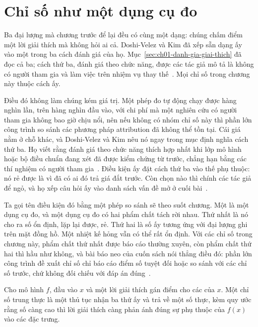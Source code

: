 \section{Chỉ số như một dụng cụ đo}
\label{sec:ch08-chi-so-nhu-mot-dung-cu}

%
%
Ba đại lượng mà chương trước để lại đều có cùng một dạng: chúng chấm điểm một
lời giải thích mà không hỏi ai cả. Doshi-Velez và Kim đã xếp sẵn dạng ấy vào một
trong ba cách đánh giá của họ. Mục~\ref{sec:ch01-danh-gia-giai-thich} đã đọc cả
ba; cách thứ ba, đánh giá theo chức năng, được các tác giả mô tả là không có
người tham gia và làm việc trên nhiệm vụ thay thế~\autocite{p14rigorous}. Mọi
chỉ số trong chương này thuộc cách ấy.

Điều đó không làm chúng kém giá trị. Một phép đo tự động chạy được hàng nghìn
lần, trên hàng nghìn đầu vào, với chi phí mà một nghiên cứu có người tham gia
không bao giờ chịu nổi, nên nếu không có nhóm chỉ số này thì phần lớn công trình
so sánh các phương pháp attribution đã không thể tồn tại. Cái giá nằm ở chỗ
khác, và Doshi-Velez và Kim nêu nó ngay trong mục định nghĩa cách thứ ba. Họ viết
rằng đánh giá theo chức năng thích hợp nhất khi lớp mô hình hoặc bộ điều chuẩn
đang xét đã được kiểm chứng từ trước, chẳng hạn bằng các thí nghiệm có người
tham gia~\autocite{p14rigorous}. Điều kiện ấy đặt cách thứ ba vào thế phụ thuộc:
nó rẻ được là vì đã có ai đó trả giá đắt trước. Còn chọn  nào
thì chính các tác giả để ngỏ, và họ xếp câu hỏi ấy vào danh sách vấn đề mở ở
cuối bài~\autocite{p14rigorous}.

Ta gọi tên điều kiện đó bằng một phép so sánh sẽ theo suốt chương. Một 
là một dụng cụ đo, và một dụng cụ đo có hai phẩm chất tách rời nhau.
Thứ nhất là nó cho ra số ổn định, lặp lại được, rẻ. Thứ hai là số ấy tương ứng
với đại lượng ghi trên mặt đồng hồ. Một nhiệt kế hỏng vẫn có thể rất ổn định.
Với các chỉ số trong chương này, phẩm chất thứ nhất được báo cáo thường xuyên,
còn phẩm chất thứ hai thì hầu như không, và bài báo neo của cuốn sách nói thẳng
điều đó: phần lớn công trình đề xuất chỉ số chỉ báo cáo điểm số tuyệt đối hoặc
so sánh với các chỉ số trước, chứ không đối chiếu với đáp án
đúng~\autocite{p21metrics}.

\begin{definition}
\label{def:ch08-chi-so-trung-thuc}
Cho mô hình $f$, đầu vào $x$ và một lời giải thích gán điểm cho các
 của $x$. Một chỉ số trung thực là một thủ tục nhận ba thứ ấy và trả về một số
thực, kèm quy ước rằng số càng cao thì lời giải thích càng phản ánh đúng sự phụ
thuộc của $f(x)$ vào các đặc trưng.
\end{definition}

